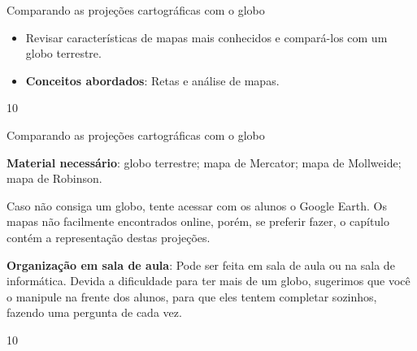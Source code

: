 \begin{objectives}{Comparando as projeções cartográficas com o globo}
{
 \begin{itemize}
  \item Revisar características de mapas mais conhecidos e compará-los com um globo terrestre.
  \item \textbf{Conceitos abordados}: Retas e análise de mapas.
  \end{itemize} 
}{1}{0}
\end{objectives}
\begin{sugestions}{Comparando as projeções cartográficas com o globo}
{
  \textbf{Material necessário}: globo terrestre; mapa de Mercator; mapa de Mollweide; mapa de Robinson.

  Caso não consiga um globo, tente acessar com os alunos o Google Earth. Os mapas não facilmente encontrados online, porém, se preferir fazer, o capítulo contém a representação destas projeções.

  \textbf{Organização em sala de aula}: Pode ser feita em sala de aula ou na sala de informática. Devida a dificuldade para ter mais de um globo, sugerimos que você o manipule na frente dos alunos, para que eles tentem completar sozinhos, fazendo uma pergunta de cada vez. 
}
{1}{0}
\end{sugestions}
